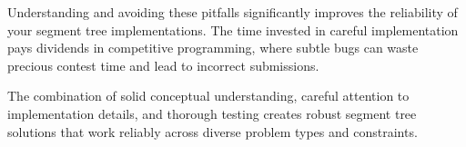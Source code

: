 
Understanding and avoiding these pitfalls significantly improves the reliability of your segment tree implementations. The time invested in careful implementation pays dividends in competitive programming, where subtle bugs can waste precious contest time and lead to incorrect submissions.

The combination of solid conceptual understanding, careful attention to implementation details, and thorough testing creates robust segment tree solutions that work reliably across diverse problem types and constraints.